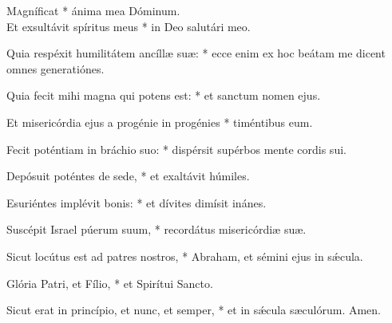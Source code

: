 

\lettrine{M}agníficat * ánima mea Dóminum.\\ Et exsultávit spíritus meus * in Deo salutári meo.

 Quia respéxit humilitátem ancíllæ suæ: * ecce enim ex hoc beátam me dicent omnes generatiónes.

 Quia fecit mihi magna qui potens est: * et sanctum nomen ejus.

 Et misericórdia ejus a progénie in progénies * timéntibus eum.

 Fecit poténtiam in bráchio suo: * dispérsit supérbos mente cordis sui.

 Depósuit poténtes de sede, * et exaltávit húmiles.

 Esuriéntes implévit bonis: * et dívites dimísit inánes.

 Suscépit Israel púerum suum, * recordátus misericórdiæ suæ.

 Sicut locútus est ad patres nostros, * Abraham, et sémini ejus in sǽcula.

 Glória Patri, et Fílio, * et Spirítui Sancto.

 Sicut erat in princípio, et nunc, et semper, * et in sǽcula sæculórum. Amen.
 
